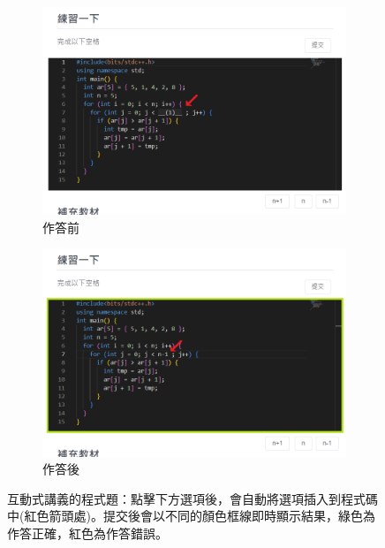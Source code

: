\begin{enumerate}
  \begin{figure}[H]
    \begin{subfigure}{0.5\linewidth}
      \centering
        \includegraphics[width=1\textwidth]{images/problem.png}
      \caption{作答前}
    \end{subfigure}
    \begin{subfigure}{0.5\linewidth}
      \centering
        \includegraphics[width=1\textwidth]{images/problem-ac.png}
      \caption{作答後}
    \end{subfigure}
    \caption[互動式講義的程式題]{互動式講義的程式題：點擊下方選項後，會自動將選項插入到程式碼中(紅色箭頭處)。提交後會以不同的顏色框線即時顯示結果，綠色為作答正確，紅色為作答錯誤。}
    \label{fig:problem}
  \end{figure}


\end{enumerate}
